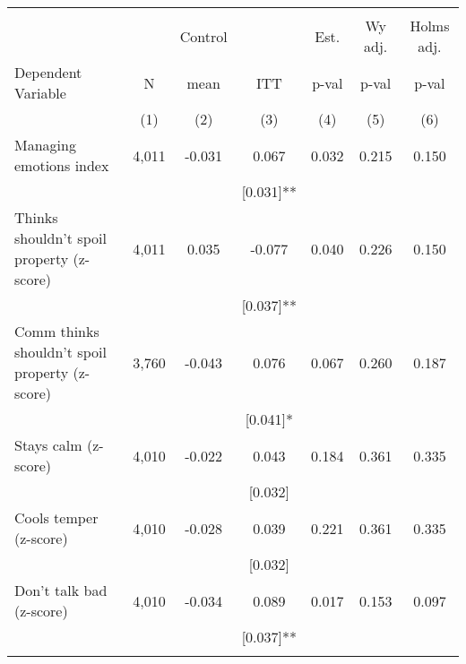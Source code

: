 \begin{tabular}{lcccccc}
\hline \noalign{\smallskip} &  &  &  &  &  & \\
 &  & Control &  & Est. & Wy adj. & Holms adj.\\
Dependent Variable & N & mean & ITT & p-val & p-val & p-val\\
 & (1) & (2) & (3) & (4) & (5) & (6)\\
\noalign{\smallskip}\hline \noalign{\smallskip}\quad Managing emotions index & 4,011 & -0.031 & 0.067 & 0.032 & 0.215 & 0.150\\
 &  &  & [0.031]** &  &  & \\
\quad Thinks shouldn't spoil property (z-score) & 4,011 & 0.035 & -0.077 & 0.040 & 0.226 & 0.150\\
 &  &  & [0.037]** &  &  & \\
\quad Comm thinks shouldn't spoil property (z-score) & 3,760 & -0.043 & 0.076 & 0.067 & 0.260 & 0.187\\
 &  &  & [0.041]* &  &  & \\
\quad Stays calm (z-score) & 4,010 & -0.022 & 0.043 & 0.184 & 0.361 & 0.335\\
 &  &  & [0.032] &  &  & \\
\quad Cools temper (z-score) & 4,010 & -0.028 & 0.039 & 0.221 & 0.361 & 0.335\\
 &  &  & [0.032] &  &  & \\
\quad Don't talk bad (z-score) & 4,010 & -0.034 & 0.089 & 0.017 & 0.153 & 0.097\\
 &  &  & [0.037]** &  &  & \\
\noalign{\smallskip}\hline\end{tabular}
